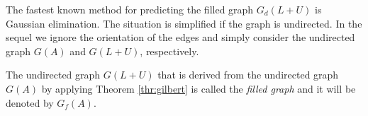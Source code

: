 The fastest known method for predicting the filled graph $G_d(L+U)$ is Gaussian elimination. 
The situation is simplified if the
 graph is undirected. 
In the sequel we ignore the orientation of the edges and simply consider
the undirected graph $G(A)$ and $G(L+U)$, respectively.

\begin{definition}\label{def:filled-graph}
The undirected graph $G(L+U)$ that is derived from the undirected graph 
$G(A)$ by applying Theorem \ref{thr:gilbert} is called the \emph{filled graph} 
and it will be denoted by $G_f(A)$.
\end{definition}


%
%
